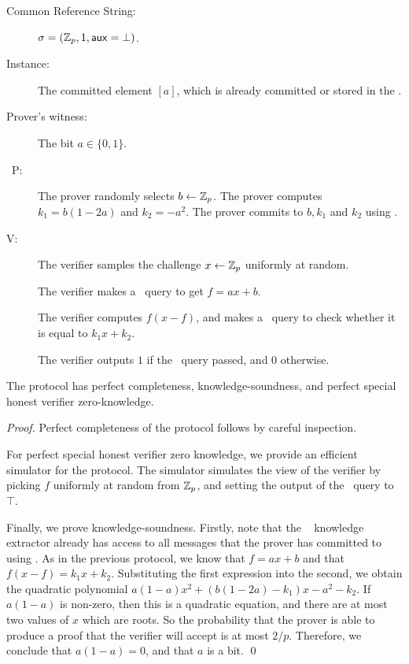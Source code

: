\begin{description} \label{prot:ILCcombits}
\item[Common Reference String:] $\mathsf{\sigma}=(\mathbb{Z}_p,1,\mathsf{aux}=\bot)$.
\item[Instance:] The committed element $[a]$, which is already committed or stored in the \ILC.
%
\item[Prover's witness:] The bit $a \in \lbrace 0,1 \rbrace$.
%
\item[\ P:] The prover randomly selects $b \gets \mathbb{Z}_p$. The prover computes $k_1 = b(1-2a)$ and $k_2 = -a^2$. The prover commits to $b, k_1$ and $k_2$ using \ILCcommit.

\item[V:] The verifier samples the challenge $x \gets \mathbb{Z}_p$ uniformly at random.

The verifier makes a \ILCopen\ query to get $f = ax+b$.

The verifier computes $f(x-f)$, and makes a \ILCcheck\ query to check whether it is equal to $k_1 x + k_2$.

The verifier outputs $1$ if the \ILCcheck\ query passed, and $0$ otherwise.
\end{description}

\begin{lemma} \label{proof:ILCcombits}
The protocol has perfect completeness, knowledge-soundness, and perfect special honest verifier zero-knowledge.
\end{lemma}

\begin{proof}
Perfect completeness of the protocol follows by careful inspection.

For perfect special honest verifier zero knowledge, we provide an efficient simulator for the protocol. The simulator simulates the view of the verifier by picking $f$ uniformly at random from $\mathbb{Z}_p$, and setting the output of the \ILCcheck\ query to $\top$.

Finally, we prove knowledge-soundness. Firstly, note that the \ILC~ knowledge extractor already has access to all messages that the prover has committed to using \ILCcommit. As in the previous protocol, we know that $f = ax+b$ and that $f(x-f) = k_1 x + k_2$. Substituting the first expression into the second, we obtain the quadratic polynomial $a(1-a)x^2 + (b(1-2a)-k_1)x-a^2-k_2$. If $a(1-a)$ is non-zero, then this is a quadratic equation, and there are at most two values of $x$ which are roots. So the probability that the prover is able to produce a proof that the verifier will accept is at most $2/p$. Therefore, we conclude that $a(1-a) = 0$, and that $a$ is a bit. \qed
\end{proof}